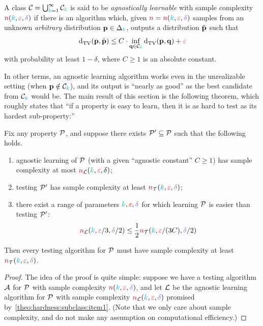 \begin{definition}
	A class $\mathcal{C}=\bigcup_{{\textcolor{cyan}{k}}=1}^\infty \mathcal{C}_{\textcolor{cyan}{k}}$ is said to be \emph{agnostically learnable} with sample complexity $\ns(\ab,\dst,\errprob)$ if there is an algorithm which, given $\ns=\ns(\ab,\dst,\errprob)$ \iid samples from an unknown \emph{arbitrary} distribution $\mathbf{p}\in\Delta_{{\textcolor{cyan}{k}}}$, outputs a distribution $\hat{\mathbf{p}}$ such that
	\[
		\totalvardist{\p}{\hat{\p}} \leq C\cdot \inf_{\q\in\class_\ab} \totalvardist{\p}{\q} + \dst
	\]
with probability at least $1-\delta$, where $C\geq 1$ is an absolute constant.
\end{definition}
In other terms, an agnostic learning algorithm works even in the unrealizable setting (when $\mathbf{p}\notin\mathcal{C}_{\textcolor{cyan}{k}}$), and its output is ``nearly as good'' as the best candidate from $\mathcal{C}_{\textcolor{cyan}{k}}$ would be. The main result of this section is the following theorem, which roughly states that ``if a property is easy to learn, then it is as hard to test as its hardest sub-property:''
\begin{theorem}\label{theo:hardness:subclass}
  Fix any property $\mathcal{P}$, and suppose there exists $\mathcal{P}'\subseteq \mathcal{P}$ such that the following holds.
  \begin{enumerate}
    \item\label{theo:hardness:subclass:item1} agnostic learning of $\mathcal{P}$ (with a given ``agnostic constant'' $C\geq 1$) has sample complexity at most ${\textcolor{purple}{n}}_{\mathcal{L}}({\textcolor{cyan}{k}},\textcolor{red}{\varepsilon},\delta)$;
    \item testing $\mathcal{P}'$ has sample complexity at least $\ns_{\mathcal{T}}(\ab,\dst,\errprob)$;
    \item there exist a range of parameters $\ab,\dst,\errprob$ for which learning $\mathcal{P}$ is easier than testing $\mathcal{P}'$: 
    	\[
    		\ns_{\mathcal{L}}(\ab,\dst/3,\errprob/2) \leq \frac{1}{2}\ns_{\mathcal{T}}(\ab,\dst/(3C),\errprob/2)
    	\]
  \end{enumerate}
  Then every testing algorithm for $\mathcal{P}$ must have sample complexity at least $\ns_{\mathcal{T}}(\ab,\dst,\errprob)$.
\end{theorem}
\begin{proof}
The idea of the proof is quite simple: suppose we have a testing algorithm $\mathcal{A}$ for $\mathcal{P}$ with sample complexity $\ns(\ab,\dst,\errprob)$, and let $\mathcal{L}$ be the agnostic learning algorithm for $\mathcal{P}$ with sample complexity $\ns_{\mathcal{L}}(\ab,\dst,\errprob)$ promised by~\cref{theo:hardness:subclass:item1}. (Note that we only care about sample complexity, and do not make any assumption on computational efficiency.)
\end{proof}

